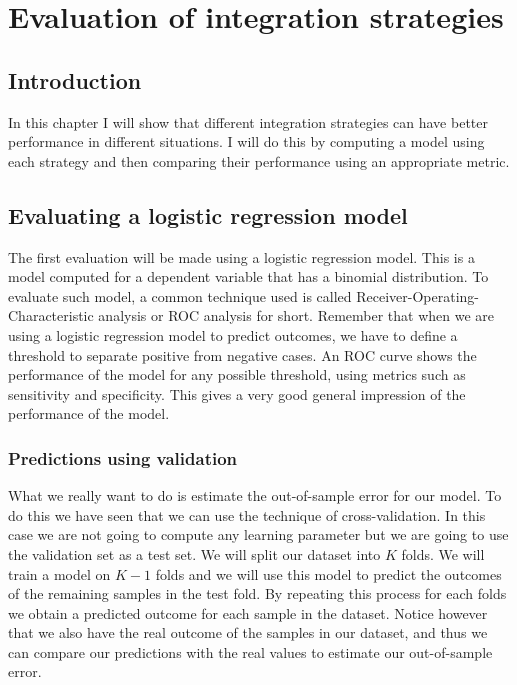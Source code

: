 \chapter{Evaluation of integration strategies}
\label{cha:evaluation}


\section{Introduction}
\label{sec:evaluation-introduction}
In this chapter I will show that different integration strategies can have better performance in different situations. I will do this by computing a model using each strategy and then comparing their performance using an appropriate metric.
\section{Evaluating a logistic regression model}
\label{sec:evaluation-logisticregression}
The first evaluation will be made using a logistic regression model. This is a model computed for a dependent variable that has a binomial distribution. To evaluate such model, a common technique used is called Receiver-Operating-Characteristic analysis\cite{zweig1993receiver}\cite{hajian2013receiver}\cite{wikiroc} or ROC analysis for short. Remember that when we are using a logistic regression model to predict outcomes, we have to define a threshold to separate positive from negative cases. An ROC curve shows the performance of the model for any possible threshold, using metrics such as sensitivity and specificity. This gives a very good general impression of the performance of the model.
\subsection{Predictions using validation}
What we really want to do is estimate the out-of-sample error for our model. To do this we have seen that we can use the technique of cross-validation. In this case we are not going to compute any learning parameter but we are going to use the validation set as a test set. We will split our dataset into $K$ folds. We will train a model on $K-1$ folds and we will use this model to predict the outcomes of the remaining samples in the test fold. By repeating this process for each folds we obtain a predicted outcome for each sample in the dataset. Notice however that we also have the real outcome of the samples in our dataset, and thus we can compare our predictions with the real values to estimate our out-of-sample error.

